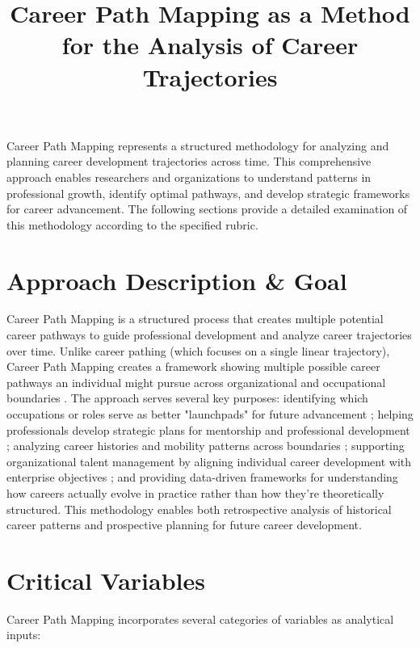 \documentclass{article}
\title{Career Path Mapping as a Method for the Analysis of Career Trajectories}
\author{}
\date{}
\begin{document}
\maketitle

Career Path Mapping represents a structured methodology for analyzing and planning career development trajectories across time. This comprehensive approach enables researchers and organizations to understand patterns in professional growth, identify optimal pathways, and develop strategic frameworks for career advancement. The following sections provide a detailed examination of this methodology according to the specified rubric.

\section{Approach Description \& Goal}

Career Path Mapping is a structured process that creates multiple potential career pathways to guide professional development and analyze career trajectories over time. Unlike career pathing (which focuses on a single linear trajectory), Career Path Mapping creates a framework showing multiple possible career pathways an individual might pursue across organizational and occupational boundaries \citep{chronus2024}. The approach serves several key purposes: identifying which occupations or roles serve as better "launchpads" for future advancement \citep{workforcegps2023}; helping professionals develop strategic plans for mentorship and professional development \citep{ncsu2023}; analyzing career histories and mobility patterns across boundaries \citep{joseph2012}; supporting organizational talent management by aligning individual career development with enterprise objectives \citep{chronus2024}; and providing data-driven frameworks for understanding how careers actually evolve in practice rather than how they're theoretically structured. This methodology enables both retrospective analysis of historical career patterns and prospective planning for future career development.

\section{Critical Variables}

Career Path Mapping incorporates several categories of variables as analytical inputs:
\end{document}
